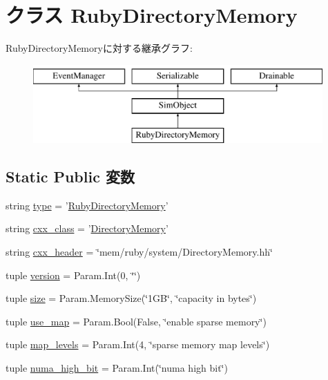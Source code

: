 \hypertarget{classDirectoryMemory_1_1RubyDirectoryMemory}{
\section{クラス RubyDirectoryMemory}
\label{classDirectoryMemory_1_1RubyDirectoryMemory}
}
RubyDirectoryMemoryに対する継承グラフ:\begin{figure}[H]
\begin{center}
\leavevmode
\includegraphics[height=3cm]{classDirectoryMemory_1_1RubyDirectoryMemory}
\end{center}
\end{figure}
\subsection*{Static Public 変数}
\begin{DoxyCompactItemize}
\item 
string \hyperlink{classDirectoryMemory_1_1RubyDirectoryMemory_acce15679d830831b0bbe8ebc2a60b2ca}{type} = '\hyperlink{classDirectoryMemory_1_1RubyDirectoryMemory}{RubyDirectoryMemory}'
\item 
string \hyperlink{classDirectoryMemory_1_1RubyDirectoryMemory_a58cd55cd4023648e138237cfc0822ae3}{cxx\_\-class} = '\hyperlink{classDirectoryMemory}{DirectoryMemory}'
\item 
string \hyperlink{classDirectoryMemory_1_1RubyDirectoryMemory_a17da7064bc5c518791f0c891eff05fda}{cxx\_\-header} = \char`\"{}mem/ruby/system/DirectoryMemory.hh\char`\"{}
\item 
tuple \hyperlink{classDirectoryMemory_1_1RubyDirectoryMemory_a76aa01cd80eeb03b381ebe36f17c16b2}{version} = Param.Int(0, \char`\"{}\char`\"{})
\item 
tuple \hyperlink{classDirectoryMemory_1_1RubyDirectoryMemory_a377e5da8df1f89c5468c8b8cd07eac89}{size} = Param.MemorySize(\char`\"{}1GB\char`\"{}, \char`\"{}capacity in bytes\char`\"{})
\item 
tuple \hyperlink{classDirectoryMemory_1_1RubyDirectoryMemory_a70924397f00d2b3ada9c275ee02937ed}{use\_\-map} = Param.Bool(False, \char`\"{}enable sparse memory\char`\"{})
\item 
tuple \hyperlink{classDirectoryMemory_1_1RubyDirectoryMemory_ab134fc21ecd7e828564de3e0538e8580}{map\_\-levels} = Param.Int(4, \char`\"{}sparse memory map levels\char`\"{})
\item 
tuple \hyperlink{classDirectoryMemory_1_1RubyDirectoryMemory_aed055aaae53c2a47a1cfb9df844edf0a}{numa\_\-high\_\-bit} = Param.Int(\char`\"{}numa high bit\char`\"{})
\end{DoxyCompactItemize}


